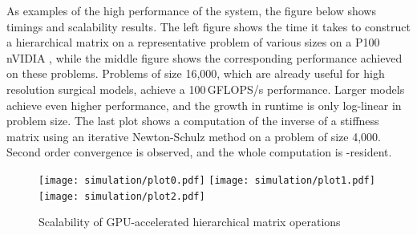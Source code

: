 %


%

As examples of the high performance of the system, the figure below shows  timings and scalability results. The left figure shows the time it takes to construct a hierarchical matrix on a representative problem of various sizes on a P100 nVIDIA , while the middle figure shows the corresponding performance achieved on these problems. Problems of size 16,000, which are already useful for high resolution surgical models, achieve a 100\,GFLOPS/s performance. Larger models achieve even higher performance, and the growth in runtime is only log-linear in problem size. The last plot shows a computation of the inverse of a stiffness matrix using an iterative Newton-Schulz method on a problem of size 4,000. Second order convergence is observed, and the whole computation is -resident.

\begin{figure}
  \centering%
  \texttt{[image: simulation/plot0.pdf]}
  \hfill%
  \texttt{[image: simulation/plot1.pdf]}
  \hfill%
  \texttt{[image: simulation/plot2.pdf]}
  \vspace{-15ex}
  \caption{Scalability of GPU-accelerated hierarchical matrix operations}
  \label{fig:plots}
\end{figure}

